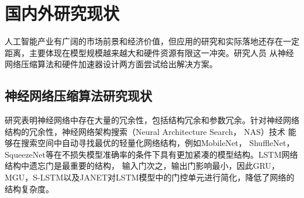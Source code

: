 

\section{国内外研究现状}
人工智能产业有广阔的市场前景和经济价值，但应用的研究和实际落地还存在一定距离，主要体现在模型规模越来越大和硬件资源有限这一冲突。研究人员
从神经网络压缩算法和硬件加速器设计两方面尝试给出解决方案。

\subsection{神经网络压缩算法研究现状}
研究表明神经网络中存在大量的冗余性，包括结构冗余和参数冗余。针对神经网络结构的冗余性，神经网络架构搜索（Neural Architecture Search， NAS）技术
能够在搜索空间中自动寻找最优的轻量化网络结构，例如MobileNet，
ShuffleNet，SqueezeNet等在不损失模型准确率的条件下具有更加紧凑的模型结构。LSTM网络结构中遗忘门是最重要的结构，
输入门次之，输出门影响最小，因此GRU，MGU，S-LSTM以及JANET对LSTM模型中的门控单元进行简化，降低了网络的结构复杂度。

